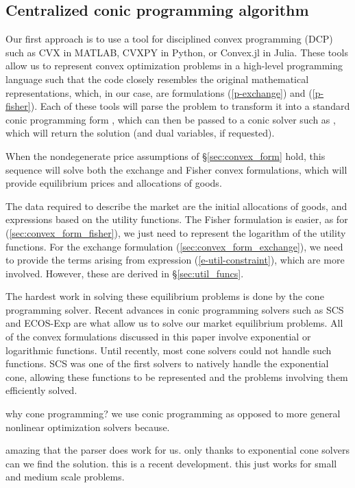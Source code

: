 \documentclass[12pt]{article}
\begin{document}
\subsection{Centralized conic programming algorithm}
\label{sec:centralized}

Our first approach is to use a tool for disciplined convex programming (DCP)
\cite{GBY:06,Grant2004} such as CVX \cite{cvx} in MATLAB, CVXPY \cite{cvxpy} in
Python, or Convex.jl \cite{convex.jl} in Julia. These tools allow us to
represent convex optimization problems in a high-level programming language
such that the code closely resembles the original mathematical representations,
which, in our case, are formulations (\ref{p-exchange}) and (\ref{p-fisher}).
Each of these tools will parse the problem to transform it into a standard
conic programming form \cite{}, which can then be passed to a conic solver
such as \cite{scs}, which will return the solution (and dual variables, if
requested).

When the nondegenerate price assumptions of \S\ref{sec:convex_form} hold, this
sequence will solve both the exchange and Fisher convex formulations,
which will provide equilibrium prices and allocations of goods.

The data required to describe the market are the initial allocations of goods,
and expressions based on the utility functions. The Fisher formulation is easier,
as for (\ref{sec:convex_form_fisher}), we just need to represent the 
logarithm of the utility functions. For the exchange formulation
(\ref{sec:convex_form_exchange}), we need to provide the terms arising
from expression (\ref{e-util-constraint}), which are more involved. However,
these are derived in \S\ref{sec:util_funcs}.

The hardest work in solving these equilibrium problems is done by the 
cone programming solver. Recent advances in conic programming
solvers such as SCS \cite{scs} and ECOS-Exp are what allow us to
solve our market equilibrium problems. All of the convex
formulations discussed in this paper involve exponential
or logarithmic functions. Until recently, most cone solvers
could not handle such functions. SCS was one of the first solvers
to natively handle the exponential cone, allowing these functions
to be represented and the problems involving them
efficiently solved.


why cone programming? we use conic programming as opposed to more
general nonlinear optimization solvers because.


amazing that the parser does work for us. only thanks to exponential cone solvers
can we find the solution. this is a recent development.
this just works for small and medium scale problems.
\end{document}

